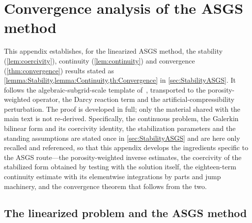 %
\section{Convergence analysis of the ASGS method}\label{app:Continuity}

This appendix establishes, for the linearized ASGS method, the stability
(\cref{lem:coercivity}), continuity (\cref{lem:continuity}) and convergence
(\cref{thm:convergence}) results stated as
\cref{lemma:Stability,lemma:Continuity,th:Convergence} in \cref{sec:StabilityASGS}. It follows
the algebraic{\hyp}subgrid{\hyp}scale template of~\cite{codina2001stabilized}, transported to the
porosity{\hyp}weighted operator, the Darcy reaction term and the artificial{\hyp}compressibility
perturbation. The proof is developed in full; only the material shared with the main text is
not re{\hyp}derived. Specifically, the continuous problem, the Galerkin bilinear form and its
coercivity identity, the stabilization parameters and the standing assumptions are stated once
in \cref{sec:StabilityASGS} and are here only recalled and referenced, so that this appendix
develops the ingredients specific to the ASGS route---the porosity{\hyp}weighted inverse
estimates, the coercivity of the stabilized form obtained by testing with the solution itself,
the eighteen{\hyp}term continuity estimate with its elementwise integrations by parts and jump
machinery, and the convergence theorem that follows from the two.

\subsection{The linearized problem and the ASGS method}\label{sec:setting}

